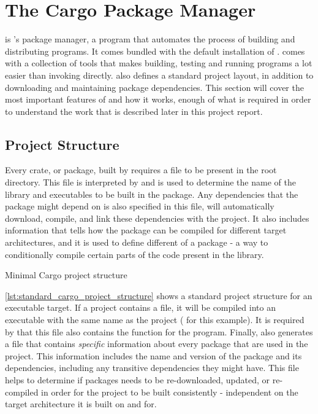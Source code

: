 
\section{The Cargo Package Manager}
\label{sec:cargo}

\cargo is \rust's package manager, a program that automates the process of building and distributing \rust programs.
It comes bundled with the default installation of \rust.
\cargo comes with a collection of tools that makes building, testing and running \rust programs a lot easier than invoking \rustc directly.
\cargo also defines a standard \rust project layout, in addition to downloading and maintaining package dependencies.
This section will cover the most important features of \cargo and how it works, enough of what is required in order to understand the work that is described later in this project report.

\subsection{Project Structure}
\label{ssub:project_structure}

Every crate, or package, built by \cargo requires a  file to be present in the root directory.
This file is interpreted by \cargo and is used to determine the name of the library and executables to be built in the package.
Any dependencies that the package might depend on is also specified in this file, \cargo will automatically download, compile, and link these dependencies with the project.
It also includes information that tells \cargo how the package can be compiled for different target architectures, and it is used to define different  of a package - a way to conditionally compile certain parts of the code present in the library.

\begin{listing}
\caption{Minimal Cargo project structure}
\label{lst:standard_cargo_project_structure}
\end{listing}

\autoref{lst:standard_cargo_project_structure} shows a standard \cargo project structure for an executable target.
If a project contains a  file, it will be compiled into an executable with the same name as the project ( for this example).
It is required by \cargo that this file also contains the \main function for the program.
Finally, \cargo also generates a  file that contains \emph{specific} information about every package that are used in the project.
This information includes the name and version of the package and its dependencies, including any transitive dependencies they might have.
This file helps \cargo to determine if packages needs to be re-downloaded, updated, or re-compiled in order for the project to be built consistently - independent on the target architecture it is built on and for.

